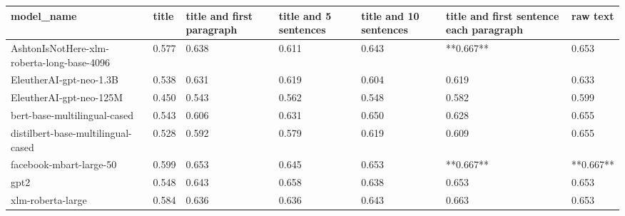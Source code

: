 \begin{tabular}{lllllll}
\toprule
                                model\_name & title & title and first paragraph & title and 5 sentences & title and 10 sentences & title and first sentence each paragraph &  raw text \\
\midrule
AshtonIsNotHere-xlm-roberta-long-base-4096 & 0.577 &                     0.638 &                 0.611 &                  0.643 &                               **0.667** &     0.653 \\
                   EleutherAI-gpt-neo-1.3B & 0.538 &                     0.631 &                 0.619 &                  0.604 &                                   0.619 &     0.633 \\
                   EleutherAI-gpt-neo-125M & 0.450 &                     0.543 &                 0.562 &                  0.548 &                                   0.582 &     0.599 \\
              bert-base-multilingual-cased & 0.543 &                     0.606 &                 0.631 &                  0.650 &                                   0.628 &     0.655 \\
        distilbert-base-multilingual-cased & 0.528 &                     0.592 &                 0.579 &                  0.619 &                                   0.609 &     0.655 \\
                   facebook-mbart-large-50 & 0.599 &                     0.653 &                 0.645 &                  0.653 &                               **0.667** & **0.667** \\
                                      gpt2 & 0.548 &                     0.643 &                 0.658 &                  0.638 &                                   0.653 &     0.653 \\
                         xlm-roberta-large & 0.584 &                     0.636 &                 0.636 &                  0.643 &                                   0.663 &     0.653 \\
\bottomrule
\end{tabular}
